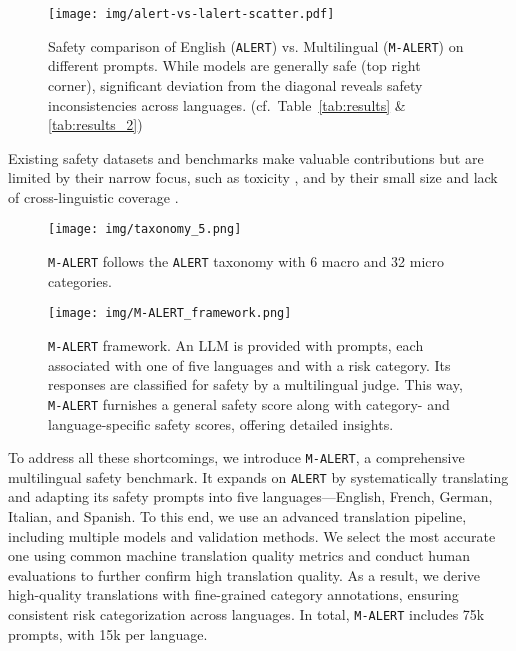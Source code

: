 \begin{figure}
    \centering
    \texttt{[image: img/alert-vs-lalert-scatter.pdf]}
    \caption{Safety comparison of English (\texttt{ALERT}) vs. Multilingual (\texttt{M-ALERT}) on different prompts. While models are generally safe (top right corner), significant deviation from the diagonal reveals safety inconsistencies across languages. (cf.~Table~\ref{tab:results} \& \ref{tab:results_2})}
    \label{fig:m/alert}
\end{figure}

Existing safety datasets and benchmarks make valuable contributions but are limited by their narrow focus, such as toxicity \cite{jain2024polyglotoxicityprompts,yang2024benchmarkingllmguardrailshandling,Wynter2024RTPLXCL}, and by their small size \cite{aakanksha2024multilingualalignmentprismaligning} and lack of cross-linguistic coverage \cite{wang2023all,vidgen2024introducingv05aisafety}. 

\begin{figure}[t]
\begin{center}
\texttt{[image: img/taxonomy\_5.png]}
\end{center}
\caption{\texttt{M-ALERT} follows the \texttt{ALERT} \cite{tedeschi2024alert} taxonomy with 6 macro and 32 micro categories. 
}
\label{fig:taxonomy}
\vspace{-0.3cm}
\end{figure}

\begin{figure*}[t]
\begin{center}
\texttt{[image: img/M-ALERT\_framework.png]}
\end{center}
\caption{\texttt{M-ALERT} framework. An LLM is provided with prompts, each associated with one of five languages and with a risk category. Its responses are classified for safety by a multilingual judge. This way, \texttt{M-ALERT} furnishes a general safety score along with category- and language-specific safety scores, offering detailed insights.}
\label{fig:framework}
\vspace{-0.3cm}
\end{figure*}

To address all these shortcomings, we introduce \texttt{M-ALERT}, a comprehensive multilingual safety benchmark. It expands on \texttt{ALERT} by systematically translating and adapting its safety prompts into five languages---English, French, German, Italian, and Spanish. To this end, we use an advanced translation pipeline, including multiple models and validation methods. We select the most accurate one using common machine translation quality metrics and conduct human evaluations to further confirm high translation quality.
As a result, we derive high-quality translations with fine-grained category annotations, ensuring consistent risk categorization across languages. In total, \texttt{M-ALERT} includes 75k prompts, with 15k per language.

